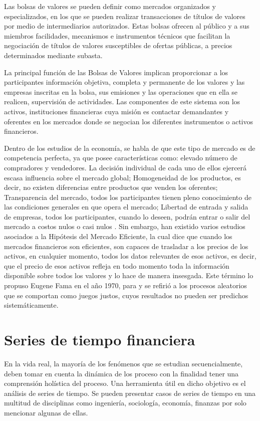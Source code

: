 Las bolsas de valores se pueden definir como mercados organizados y especializados, en los que se pueden realizar transacciones de títulos de valores por
medio de intermediarios autorizados. Estas bolsas ofrecen al público y a sus miembros facilidades, mecanismos e instrumentos técnicos que facilitan la negociación
de títulos de valores susceptibles de ofertas públicas, a precios determinados mediante subasta.

La principal función de las Bolsas de Valores implican proporcionar a los participantes información objetiva, completa y permanente de los valores
y las empresas inscritas en la bolsa, sus emisiones y las operaciones que en ella se realicen, supervisión de actividades. Las componentes de este sistema 
son los activos, instituciones financieras cuya misión es contactar demandantes y oferentes en los mercados donde se negocian
los diferentes instrumentos o activos financieros.

Dentro de los estudios de la economía, se habla de que este tipo de mercado es de competencia perfecta, ya que posee características
como: elevado número de compradores y vendedores. La decisión individual de cada uno de ellos ejercerá escasa influencia sobre el mercado global; 
Homogeneidad de los productos, es decir, no existen diferencias entre productos que venden los oferentes; Transparencia del mercado, todos los 
participantes tienen pleno conocimiento de las condiciones generales en que opera el mercado; Libertad de entrada y salida de empresas, todos 
los participantes, cuando lo deseen, podrán entrar o salir del mercado a costos nulos o casi nulos \cite{mankiw2011principles}. Sin embargo, han existido
varios estudios asociados a la Hipótesis del Mercado Eficiente, la cual dice que cuando los mercados financieros son eficientes, son capaces de trasladar 
a los precios de los activos, en cualquier momento, todos los datos relevantes de esos activos, es decir, que el precio de esos activos 
refleja en todo momento toda la información disponible sobre todos los valores y lo hace de manera insesgada. Este término lo propuso Eugene Fama en el año
1970, para y se refirió a los procesos aleatorios que se comportan como juegos justos, cuyos resultados no pueden ser predichos sistemáticamente.

\section{Series de tiempo financiera}

En la vida real, la mayoría de los fenómenos que se estudian secuencialmente, deben
tomar en cuenta la dinámica de los proceso con la finalidad tener una comprensión holística del proceso.
Una herramienta útil en dicho objetivo es el análisis de series de tiempo. Se
pueden presentar casos de series de tiempo en una multitud de disciplinas como ingeniería,
sociología, economía, finanzas por solo mencionar algunas de ellas.

